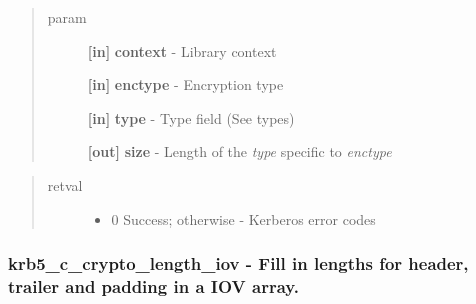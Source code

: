\documentclass[letterpaper,10pt,english]{sphinxmanual}
\begin{document}
\begin{quote}\begin{description}
\item[{param}] \leavevmode
\textbf{{[}in{]}} \textbf{context} - Library context

\textbf{{[}in{]}} \textbf{enctype} - Encryption type

\textbf{{[}in{]}} \textbf{type} - Type field (See  types)

\textbf{{[}out{]}} \textbf{size} - Length of the \emph{type} specific to \emph{enctype}

\end{description}\end{quote}
\begin{quote}\begin{description}
\item[{retval}] \leavevmode\begin{itemize}
\item {} 
0   Success; otherwise - Kerberos error codes

\end{itemize}

\end{description}\end{quote}


\subsubsection{krb5\_c\_crypto\_length\_iov -  Fill in lengths for header, trailer and padding in a IOV array.}
\label{appdev/refs/api/krb5_c_crypto_length_iov:krb5-c-crypto-length-iov-fill-in-lengths-for-header-trailer-and-padding-in-a-iov-array}\label{appdev/refs/api/krb5_c_crypto_length_iov::doc}

\begin{fulllineitems}
\label{appdev/refs/api/krb5_c_crypto_length_iov:c.krb5_c_crypto_length_iov}
\end{fulllineitems}
\end{document}
